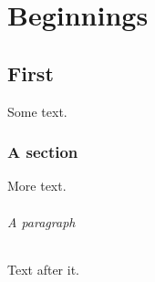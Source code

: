 \documentclass{memoir}
\begin{document}
\part{Beginnings}
\chapter{First}
Some text.
\section{A section}
More text.
\paragraph{A paragraph} Text after it.
\end{document}
